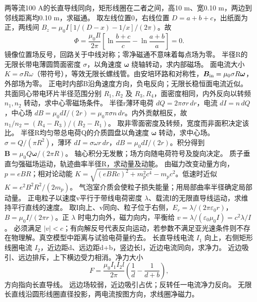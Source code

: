 \problemtext 两等流100 A的长直导线同向，矩形线圈在二者之间，高10 m、宽0.10 m，两边到邻线距离均0.10 m，求磁通。
\workings 取左线位置0，右线位置 $D=a+b+c$，出纸面为正，两线间 $B_z=\mu_0I[1/(D-x)-1/x]/(2\pi)$。故
\[
\Phi=\frac{\mu_0Il}{2\pi}\left[\ln\frac{b+c}{c}-\ln\frac{a+b}{a}\right]=0.
\]
\crosscheck 镜像位置场反号，回路关于中线对称；零净磁通不意味着每点场为零。
\problemtext 半径R的无限长带电薄圆筒面密度 $\sigma$，以角速度 $\bm\omega$ 绕轴转动，求内部磁场。
\workings 面电流大小 $K=\sigma R\omega$（带符号），等效无限长螺线管。由安培环路和对称性，$\bm B_{\rm in}=\mu_0\sigma R\bm\omega$，外部场为零。
\crosscheck 正电时内部B沿角速度方向，负电反向；无限长稳恒面电流近似。
\problemtext 共面同心带电环片半径范围分别 $R_1,R_2$ 及 $R_3,R_4$，面密度相同，内外反向以转频 $n_1,n_2$ 转动，求中心零磁场条件。
\workings 半径r薄环电荷 $dQ=2\pi\sigma r\,dr$，电流 $dI=n\,dQ$，中心场 $dB=\mu_0dI/(2r)=\mu_0\pi\sigma n\,dr$。内外贡献相反，故 $n_1/n_2=(R_4-R_3)/(R_2-R_1)$。
\crosscheck 取非零面密度及转频，宽度而非面积决定该比。
\problemtext 半径R均匀带总电荷Q的介质圆盘以角速度 $\bm\omega$ 转动，求中心场。
\workings $\sigma=Q/(\pi R^2)$，薄环 $dI=\sigma\omega r\,dr$，$dB=\mu_0dI/(2r)$。积分得到 $\bm B=\mu_0Q\bm\omega/(2\pi R)$。
\crosscheck 轴心积分无发散；场方向随电荷符号及旋向决定。
\problemtext 质子垂直匀强磁场运动，轨迹曲率半径R，求动量及动能。
\workings 由磁力改变动量方向，$p=eBR$；相对论动能 $K=\sqrt{(eBRc)^2+m_p^2c^4}-m_pc^2$。低速时近似 $K=e^2B^2R^2/(2m_p)$。
\crosscheck 气泡室介质会使粒子损失能量；用局部曲率半径确定局部动量。
\problemtext 正电粒子以速度v平行于带线电荷密度 $\lambda$、载流I的无限直导线运动，求维持平行直线的速度。
\workings 取I向上、v同向、粒子位于右侧，$E_r=\lambda/(2\pi\varepsilon_0r)$，$B=\mu_0I/(2\pi r)$。正 $\lambda$ 时电力向外，磁力向内，平衡给 $v=\lambda/(\varepsilon_0\mu_0 I)=c^2\lambda/I$。
\crosscheck 必须满足 $|v|<c$；有向解反号代表反向运动，若参数不满足亚光速条件则不存在物理解。真空模型中距离与试验电荷量约去。
\problemtext 长直导线电流 $I_1$ 向上，右侧矩形线圈电流 $I_2$，近边距d、远边距d+b，竖边长l，近边电流同向，求净力。
\workings 近边吸引、远边排斥，上下横边受力相消。净力大小
\[
F=\frac{\mu_0I_1I_2l}{2\pi}\left(\frac1d-\frac1{d+b}\right),
\]
方向指向长直导线。
\crosscheck 远边场较弱，近边吸引占优；反转任一电流净力反向。
\problemtext 无限长直线沿圆形线圈直径投影，两电流按图方向，求线圈净磁力。
